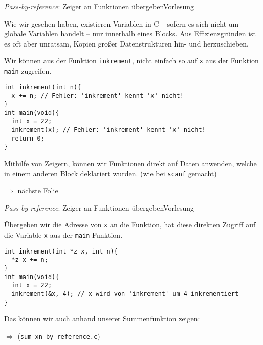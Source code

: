 \documentclass[xcolor=dvipsnames]{beamer}
\newcounter{lecturecounter}
\begin{document}
\begin{frame}[fragile]{\emph{Pass-by-reference}: Zeiger an Funktionen übergeben}{Vorlesung }
  \begin{block}{}
    Wie wir gesehen haben, existieren Variablen in C -- sofern es sich nicht um globale Variablen handelt -- nur innerhalb eines Blocks. Aus Effizienzgründen ist es oft aber unratsam, Kopien großer Datenstrukturen hin- und herzuschieben.
  \end{block}
  Wir können aus der Funktion \texttt{inkrement}, nicht einfach so auf \texttt{x} aus der Funktion \texttt{main} zugreifen.
  \begin{lstlisting}
int inkrement(int n){
  x += n; // Fehler: 'inkrement' kennt 'x' nicht!
}  
int main(void){
  int x = 22;
  inkrement(x); // Fehler: 'inkrement' kennt 'x' nicht!
  return 0;
} 
\end{lstlisting}
\vspace{-0.4cm}
  \begin{block}{}
    Mithilfe von Zeigern, können wir Funktionen direkt auf Daten anwenden, welche in einem anderen Block deklariert wurden. (wie bei \texttt{scanf} gemacht)
  \end{block}
  $\Rightarrow$  nächste Folie
\end{frame}

\begin{frame}[fragile]{\emph{Pass-by-reference}: Zeiger an Funktionen übergeben}{Vorlesung }
  \begin{block}{}
    Übergeben wir die Adresse von \texttt{x} an die Funktion, hat diese direkten Zugriff auf die Variable \texttt{x} aus der \texttt{main}-Funktion.
  \end{block}
  \begin{lstlisting}
int inkrement(int *z_x, int n){
  *z_x += n;
}  
int main(void){
  int x = 22;
  inkrement(&x, 4); // x wird von 'inkrement' um 4 inkrementiert
}
\end{lstlisting}
\vspace{-0.4cm}
  \begin{block}{}
    Das können wir auch anhand unserer Summenfunktion zeigen:
  \end{block}
  $\Rightarrow$ (\verb|sum_xn_by_reference.c|)
\end{frame}
\end{document}
